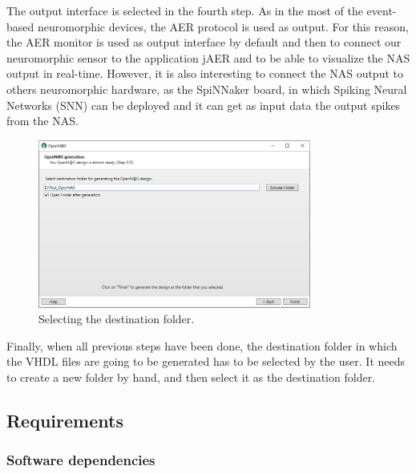 The output interface is selected in the fourth step. As in the most of the event-based neuromorphic devices, the AER protocol is used as output. For this reason, the AER monitor is used as output interface by default and then to connect our neuromorphic sensor to the application jAER and to be able to visualize the NAS output in real-time. However, it is also interesting to connect the NAS output to others neuromorphic hardware, as the SpiNNaker board, in which Spiking Neural Networks (SNN) can be deployed and it can get as input data the output spikes from the NAS. 

\begin{figure}[H]
\centering
\includegraphics[width=0.8\textwidth]{images/Img24_S5_SaveFiles.PNG}
\caption{\label{fig:wizard_overview_s5}Selecting the destination folder.}
\end{figure}

Finally, when all previous steps have been done, the destination folder in which the VHDL files are going to be generated has to be selected by the user. It needs to create a new folder by hand, and then select it as the destination folder. 

\subsection{Requirements}

\subsubsection{Software dependencies}

